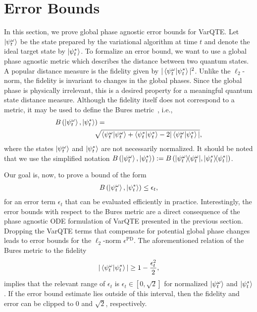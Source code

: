 \documentclass[twocolumn, aps, pra, superscriptaddress]{revtex4-1}
\newcommand{\proj}[1]{|#1\rangle\!\langle #1|}
\begin{document}
\section{Error Bounds}
\label{sec:error_bounds}
In this section, we prove global phase agnostic error bounds for VarQTE.
Let $\ket{\psi^{\omega}_t}$ be the state prepared by the variational algorithm at time $t$ and denote the ideal target state by $\ket{\psi^*_t}$. 
To formalize an error bound, we want to use a global phase agnostic metric which describes the distance between two quantum states.
A popular distance measure is the fidelity \cite{nielsen10} given by $|\braket{\psi^{\omega}_t|\psi^*_t}|^2$. Unlike the $\ell_2$-norm, the fidelity is invariant to changes in the global phases.  Since the global phase is physically irrelevant, 
this is a desired property for a meaningful quantum state distance measure. Although the fidelity itself does not correspond to a metric, it may be used to define the Bures metric~\cite{HayashiQuantumInfo06}, i.e.,
\begin{align}
	&B\left(\ket{\psi^{\omega}_t}, \ket{\psi^*_t} \right)= \nonumber \\ 
	&\hspace{20mm} \sqrt{\braket{\psi^{\omega}_t|\psi^{\omega}_t}+\braket{\psi^*_t|\psi^*_t}-2|\braket{\psi^{\omega}_t|\psi^*_t}|},
 \end{align}
 where the states $\ket{\psi^{\omega}_t}$ and $\ket{\psi^*_t}$ are not necessarily normalized. It should be noted that we use the simplified notation $B\left(\ket{\psi^{\omega}_t}, \ket{\psi^*_t} \right):=B\left(\proj{\psi^{\omega}_t}, \proj{\psi^*_t} \right)$.

Our goal is, now, to prove a bound of the form
\begin{align}
	B\left(\ket{\psi^{\omega}_t}, \ket{\psi^*_t} \right) \leq \epsilon_t,
\end{align}
for an error term $\epsilon_t$ that can be evaluated efficiently in practice.
Interestingly, the error bounds with respect to the Bures metric are a direct consequence of the phase agnostic ODE formulation of VarQTE presented in the previous section.
Dropping the VarQTE terms that compensate for potential global phase changes leads to error bounds for the $\ell_2$-norm $\epsilon^{\text{PD}}$.
The aforementioned relation of the Bures metric to the fidelity
\begin{align}
    |\braket{\psi^{\omega}_t|\psi^*_t}| \geq 1 - \frac{\epsilon_t^2}{2},
\end{align}
 implies that the relevant range of $\epsilon_t$ is $\epsilon_t\in\left[0, \sqrt{2}\right]$ for normalized $\ket{\psi^{\omega}_t}$ and $\ket{\psi^*_t}$.
If the error bound estimate lies outside of this interval, then the fidelity and error can be clipped to $0$ and  $\sqrt{2}$, respectively.
\end{document}
